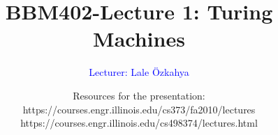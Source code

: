 \documentclass[xcolor=dvipsnames,smaller]{beamer}
\title[BBM402-Lecture 1: Turing Machines]
{BBM402-Lecture 1: Turing Machines}
\author{
\vspace{2cm}
\textcolor{Blue}{\large{Lecturer: Lale \"Ozkahya}}}
\date{
\footnotesize{
Resources for the presentation:\\
https://courses.engr.illinois.edu/cs373/fa2010/lectures\\
https://courses.engr.illinois.edu/cs498374/lectures.html}}
\begin{document}
\newtheorem{thm}[theorem] {Theorem}
\newtheorem{lem}[theorem]{Lemma}
\newtheorem{cor}[theorem]{Corollary}
\newtheorem{prp}[theorem]{Proposition}
\newtheorem{clm}[theorem]{Claim}
\newtheorem{conj}[theorem]{Conjecture}
\newtheorem{remark}[theorem]{Remark}
\newtheorem{construction}[theorem]{Construction}

\def\EE{\mathcal{E}}


\def\tr{\textcolor{Red}}
\def\tb{\textcolor{Blue}}
\def\vs{\vspace{0.5cm}}

\begin{frame}
\titlepage
\end{frame}

\normalsize{




}
\end{document}
